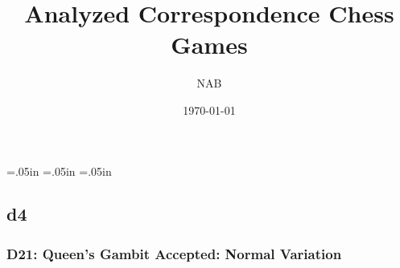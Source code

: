 \documentclass[a4paper,12pt,twoside]{article}
\begin{document}
 \topmargin=.05in
 \leftmargin=.05in
 \rightmargin=.05in
 \title{Analyzed Correspondence Chess Games}
 \author{NAB}
 \date{\today}
 \maketitle{}

\begin{multicols}{3}
\tableofcontents

\section{d4}


%
%
%

\subsubsection{D21: Queen's Gambit Accepted: Normal Variation}

%
%
%
%
%
%

\end{multicols}



\end{document}
